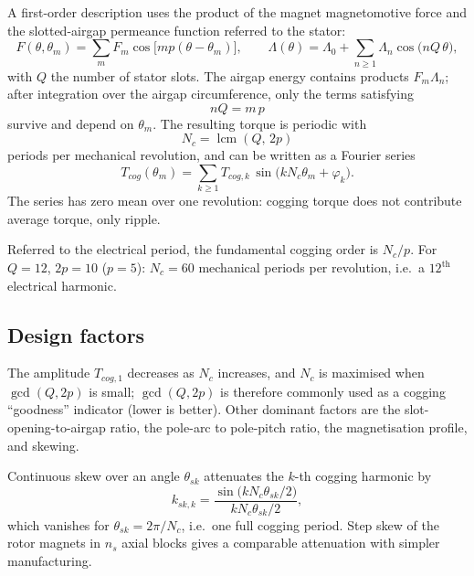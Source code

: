 \documentclass[11pt,a4paper]{article}
\newcommand{\thetam}{\theta_{m}}
\begin{document}
A first-order description uses the product of the magnet magnetomotive force
and the slotted-airgap permeance function referred to the stator:
\begin{equation}
F(\theta,\thetam)=\sum_{m}F_{m}\cos\!\big[mp(\theta-\thetam)\big],
\qquad
\Lambda(\theta)=\Lambda_{0}+\sum_{n\geq 1}\Lambda_{n}\cos\!\big(nQ\,\theta\big),
\end{equation}
with $Q$ the number of stator slots. The airgap energy contains products
$F_{m}\Lambda_{n}$; after integration over the airgap circumference, only the
terms satisfying
\begin{equation}
nQ = m\,p
\end{equation}
survive and depend on $\thetam$. The resulting torque is periodic with
\begin{equation}
N_{c} = \operatorname{lcm}(Q,\,2p)
\end{equation}
periods per mechanical revolution, and can be written as a Fourier series
\begin{equation}
T_{cog}(\thetam) = \sum_{k\geq 1} T_{cog,k}\,\sin\!\big(k N_{c}\thetam + \varphi_{k}\big).
\label{eq:cogging}
\end{equation}
The series has zero mean over one revolution: cogging torque does not
contribute average torque, only ripple.

Referred to the electrical period, the fundamental cogging order is
$N_{c}/p$. For $Q=12$, $2p=10$ ($p=5$): $N_{c}=60$ mechanical periods per
revolution, i.e.\ a $12^{\text{th}}$ electrical harmonic.

\subsection{Design factors}

The amplitude $T_{cog,1}$ decreases as $N_{c}$ increases, and $N_{c}$ is
maximised when $\gcd(Q,2p)$ is small; $\gcd(Q,2p)$ is therefore commonly used
as a cogging ``goodness'' indicator (lower is better). Other dominant factors
are the slot-opening-to-airgap ratio, the pole-arc to pole-pitch ratio, the
magnetisation profile, and skewing.

Continuous skew over an angle $\theta_{sk}$ attenuates the $k$-th cogging
harmonic by
\begin{equation}
k_{sk,k}=\frac{\sin\!\big(k N_{c}\theta_{sk}/2\big)}{k N_{c}\theta_{sk}/2},
\end{equation}
which vanishes for $\theta_{sk}=2\pi/N_{c}$, i.e.\ one full cogging period. Step
skew of the rotor magnets in $n_{s}$ axial blocks gives a comparable
attenuation with simpler manufacturing.
\end{document}
